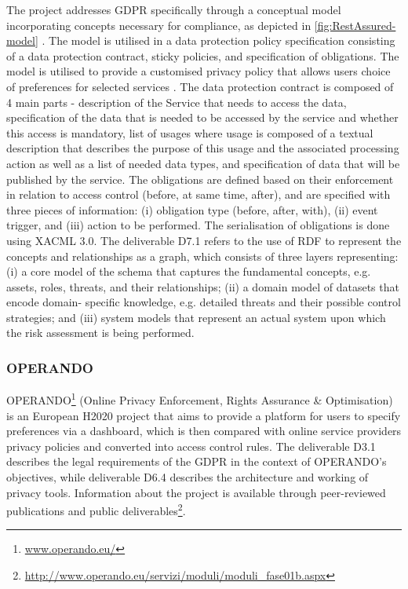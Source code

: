 The project addresses GDPR specifically through a conceptual model incorporating concepts necessary for compliance, as depicted in \autoref{fig:RestAssured-model} \cite{noauthor_d6.1.pdf_nodate}. The model is utilised in a data protection policy specification consisting of a data protection contract, sticky policies, and specification of obligations. The model is utilised to provide a customised privacy policy that allows users choice of preferences for selected services \cite{gritzalis_privacy_2019}. The data protection contract is composed of 4 main parts - description of the Service that needs to access the data, specification of the data that is needed to be accessed by the service and whether this access is mandatory, list of usages where usage is composed of a textual description that describes the purpose of this usage and the associated processing action as well as a list of needed data types, and specification of data that will be published by the service.
The obligations are defined based on their enforcement in relation to access control (before, at same time, after), and are specified with three pieces of information: (i) obligation type (before, after, with), (ii) event trigger, and (iii) action to be performed. The serialisation of obligations is done using XACML 3.0.
The deliverable D7.1 \cite{noauthor_d7.1.pdf_nodate} refers to the use of RDF to represent the concepts and relationships as a graph, which consists of three layers representing: (i) a core model of the schema that captures the fundamental concepts, e.g. assets, roles, threats, and their relationships; (ii) a domain model of datasets that encode domain- specific knowledge, e.g. detailed threats and their possible control strategies; and (iii) system models that represent an actual system upon which the risk assessment is being performed.

\subsubsection{OPERANDO}
OPERANDO\footnote{\url{www.operando.eu/}} (Online Privacy Enforcement, Rights Assurance \& Optimisation) is an European H2020 project that aims to provide a platform for users to specify preferences via a dashboard, which is then compared with online service providers privacy policies and converted into access control rules.
The deliverable D3.1 \cite{noauthor_d3.1-guidelinesonlegalaspectsv2.0_77_289.pdf_nodate} describes the legal requirements of the GDPR in the context of OPERANDO's objectives, while deliverable D6.4 \cite{noauthor_d6.4finalproductversionofprivacyenhancedtoolsv1.0_77_366.pdf_nodate} describes the architecture and working of privacy tools.
Information about the project is available through peer-reviewed publications and public deliverables\footnote{\url{http://www.operando.eu/servizi/moduli/moduli_fase01b.aspx}}.


